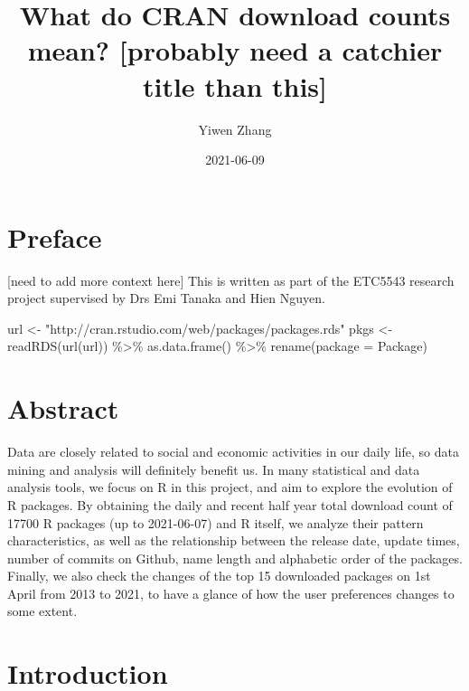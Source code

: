 \documentclass[
]{book}
\title{What do CRAN download counts mean? {[}probably need a catchier title than this{]}}
\author{Yiwen Zhang}
\date{2021-06-09}
\newenvironment{Shaded}{\begin{snugshade}}{\end{snugshade}}
\newcommand{\AttributeTok}[1]{\textcolor[rgb]{0.77,0.63,0.00}{#1}}
\newcommand{\FunctionTok}[1]{\textcolor[rgb]{0.00,0.00,0.00}{#1}}
\newcommand{\NormalTok}[1]{#1}
\newcommand{\OtherTok}[1]{\textcolor[rgb]{0.56,0.35,0.01}{#1}}
\newcommand{\SpecialCharTok}[1]{\textcolor[rgb]{0.00,0.00,0.00}{#1}}
\newcommand{\StringTok}[1]{\textcolor[rgb]{0.31,0.60,0.02}{#1}}
\begin{document}
\maketitle

{
\setcounter{tocdepth}{1}
\tableofcontents
}
\hypertarget{preface}{%
\chapter*{Preface}\label{preface}}

{[}need to add more context here{]}
This is written as part of the ETC5543 research project supervised by Drs Emi Tanaka and Hien Nguyen.

\begin{Shaded}
\begin{Highlighting}[]
\NormalTok{url }\OtherTok{\textless{}{-}} \StringTok{"http://cran.rstudio.com/web/packages/packages.rds"}
\NormalTok{pkgs }\OtherTok{\textless{}{-}} \FunctionTok{readRDS}\NormalTok{(}\FunctionTok{url}\NormalTok{(url)) }\SpecialCharTok{\%\textgreater{}\%} 
  \FunctionTok{as.data.frame}\NormalTok{() }\SpecialCharTok{\%\textgreater{}\%}
  \FunctionTok{rename}\NormalTok{(}\AttributeTok{package =}\NormalTok{ Package)}
\end{Highlighting}
\end{Shaded}

\hypertarget{abstract}{%
\chapter{Abstract}\label{abstract}}

Data are closely related to social and economic activities in our daily life, so data mining and analysis will definitely benefit us. In many statistical and data analysis tools, we focus on R in this project, and aim to explore the evolution of R packages. By obtaining the daily and recent half year total download count of 17700 R packages (up to 2021-06-07) and R itself, we analyze their pattern characteristics, as well as the relationship between the release date, update times, number of commits on Github, name length and alphabetic order of the packages. Finally, we also check the changes of the top 15 downloaded packages on 1st April from 2013 to 2021, to have a glance of how the user preferences changes to some extent.

\pagebreak

\hypertarget{intro}{%
\chapter{Introduction}\label{intro}}
\end{document}
